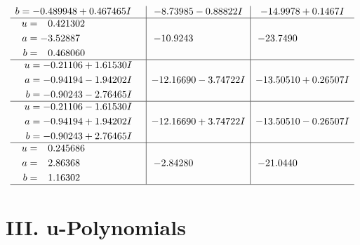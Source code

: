 \documentclass[1p]{elsarticle_modified}
\theoremstyle{definition}
\begin{document}
$$\begin{array}{c|c|c}
\begin{aligned}
b &= -0.489948 + 0.467465 I\end{aligned}
 & -8.73985 - 0.88822 I & -14.9978 + 0.1467 I \\ \hline\begin{aligned}
u &= \phantom{-}0.421302\phantom{ +0.000000I} \\
a &= -3.52887\phantom{ +0.000000I} \\
b &= \phantom{-}0.468060\phantom{ +0.000000I}\end{aligned}
 & -10.9243\phantom{ +0.000000I} & -23.7490\phantom{ +0.000000I} \\ \hline\begin{aligned}
u &= -0.21106 + 1.61530 I \\
a &= -0.94194 - 1.94202 I \\
b &= -0.90243 - 2.76465 I\end{aligned}
 & -12.16690 - 3.74722 I & -13.50510 + 0.26507 I \\ \hline\begin{aligned}
u &= -0.21106 - 1.61530 I \\
a &= -0.94194 + 1.94202 I \\
b &= -0.90243 + 2.76465 I\end{aligned}
 & -12.16690 + 3.74722 I & -13.50510 - 0.26507 I \\ \hline\begin{aligned}
u &= \phantom{-}0.245686\phantom{ +0.000000I} \\
a &= \phantom{-}2.86368\phantom{ +0.000000I} \\
b &= \phantom{-}1.16302\phantom{ +0.000000I}\end{aligned}
 & -2.84280\phantom{ +0.000000I} & -21.0440\phantom{ +0.000000I}\\
 \hline 
 \end{array}$$\newpage
\newpage\renewcommand{\arraystretch}{1}
\centering \section*{ III. u-Polynomials}
\end{document}
